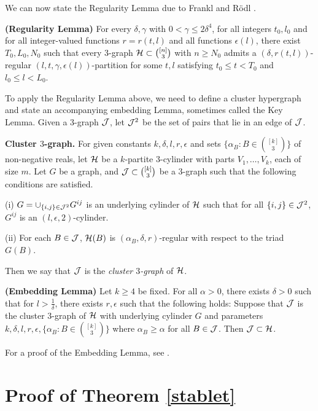 \documentclass[11pt]{article}
\begin{document}
We can now state the Regularity Lemma due to Frankl and R\"odl
\cite{FR}.

\begin{theorem} {\bf (Regularity Lemma)} \label{rl}
For every $\delta, \gamma$ with $0<\gamma\le 2\delta^4$, for all
integers $t_0, l_0$ and for all integer-valued functions $r=r(t, l)$
and all functions $\epsilon(l)$, there exist $T_0, L_0, N_0$ such
that every 3-graph ${\cal H} \subset \binom{[n]}{3}$ with $n\ge N_0$
admits a $(\delta, r(t,l))$-regular $(l, t, \gamma,
\epsilon(l))$-partition for some $t,l$ satisfying $t_0 \le t<T_0$
and $l_0\le l<L_0$.
\end{theorem}

To apply the Regularity Lemma above, we need to define a cluster hypergraph and state an accompanying embedding Lemma,
 sometimes called the Key Lemma.  Given a $3$-graph ${\cal J}$, let ${\cal J}^2$ be the set of pairs that lie in an edge of ${\cal J}$.

{\bf Cluster $3$-graph.} For given constants $k, \delta, l, r,
\epsilon$ and sets $\{\alpha_B: B \in \binom{[k]}{3}\}$ of
non-negative reals,
 let ${\cal H}$ be a $k$-partite $3$-cylinder with parts $V_1, \ldots, V_k$, each of size $m$.  Let $G$ be a graph, and
 ${\cal J} \subset \binom{[k]}{3}$ be a $3$-graph such that the following conditions are satisfied.

(i) $G=\cup_{\{i,j\} \in {\cal J}^2} G^{ij}$ is an underlying cylinder of
${\cal H}$ such that for all $\{i,j\} \in {\cal J}^2$, $G^{ij}$ is an $(l,
\epsilon, 2)$-cylinder.

(ii) For each $B \in {\cal J}$, ${\cal H}(B)$ is $(\alpha_B, \delta, r)$-regular with respect to the triad $G(B)$.

Then we say that ${\cal J}$ is the {\it cluster $3$-graph} of ${\cal H}$.

\begin{lemma} {\bf (Embedding Lemma)} \label{elemma} Let $k \ge 4$ be fixed.
 For all  $\alpha>0$, there exists $\delta>0$ such that for $l>\frac{1}{\delta}$, there exists
  $r, \epsilon$ such that the following holds: Suppose that ${\cal J}$ is the cluster $3$-graph
  of ${\cal H}$ with underlying cylinder $G$ and parameters $k, \delta, l, r, \epsilon, \{\alpha_B: B \in \binom{[k]}{3}\}$
   where $\alpha_B \ge \alpha$ for all $B \in {\cal J}$.  Then ${\cal J} \subset {\cal H}$.
\end{lemma}

For a proof of the Embedding Lemma, see \cite{NR}.


\section{Proof of Theorem \ref{stablet}}\label{sectionproofstab}
\end{document}

